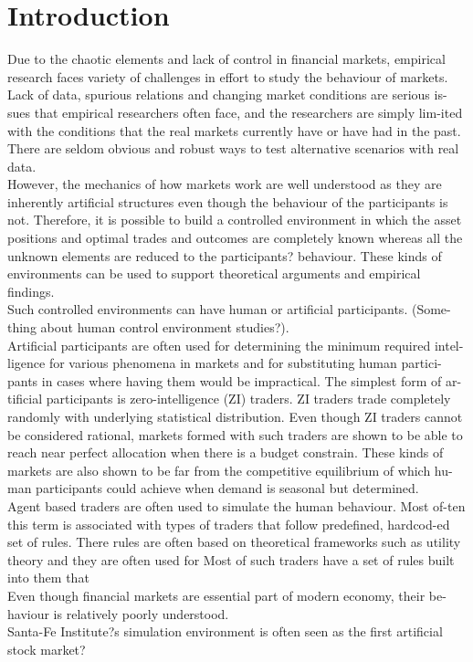 \section{Introduction}

Due to the chaotic elements and lack of control in financial markets, 
empirical research faces variety of challenges in effort to study the 
behaviour of markets. Lack of data, spurious relations and changing market 
conditions are serious is-sues that empirical researchers often 
face, and the researchers are simply lim-ited with the conditions 
that the real markets currently have or have had in the past. 
There are seldom obvious and robust ways to test alternative scenarios with real data. \\ 

However, the mechanics of how markets work are well 
understood as they are inherently artificial structures 
even though the behaviour of the participants is not. 
Therefore, it is possible to build a controlled environment 
in which the asset positions and optimal trades and outcomes 
are completely known whereas all the unknown elements are reduced 
to the participants? behaviour. These kinds of environments can be 
used to support theoretical arguments and empirical findings.\\

Such controlled environments can have human or artificial participants. 
(Some-thing about human control environment studies?).\\

Artificial participants are often used for determining the minimum required intel-ligence 
for various phenomena in markets and for substituting human 
partici-pants in cases where having them would be impractical. 
The simplest form of ar-tificial participants is zero-intelligence (ZI) traders. 
ZI traders trade completely randomly with underlying statistical distribution. 
Even though ZI traders cannot be considered rational, markets formed with such 
traders are shown to be able to reach near perfect allocation when there is a 
budget constrain. These kinds of markets are also shown to be far from the 
competitive equilibrium of which hu-man participants could achieve when demand is seasonal but determined.\\

Agent based traders are often used to simulate the human behaviour. 
Most of-ten this term is associated with types of traders that follow predefined, 
hardcod-ed set of rules. There rules are often based on theoretical 
frameworks such as utility theory and they are often used for 
Most of such traders have a set of rules built into them that \\




Even though financial markets are essential part of modern economy, their be-haviour is relatively poorly understood.\\ 

Santa-Fe Institute?s simulation environment is often seen as the first artificial stock market?\\

